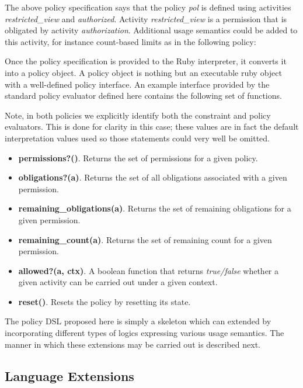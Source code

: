 

The above policy specification says that the policy {\em pol} is defined using activities {\em restricted\_view} and {\em authorized}.  Activity {\em restricted\_view} is a permission that is obligated by activity {\em authorization}.  Additional usage semantics could be added to this activity, for instance count-based limits as in the following policy:



Once the policy specification is provided to the Ruby interpreter, it converts it into a policy object. A policy object is nothing but an executable ruby object with a well-defined policy interface. An example interface provided by the standard policy evaluator defined here contains the following set of functions.

Note, in both policies we explicitly identify both the constraint and policy evaluators.  This is done for clarity in this case; these values are in fact the default interpretation values used so those statements could very well be omitted.

\begin{itemize}
\item {\bf permissions?()}. Returns the set of permissions for a given policy.
\item {\bf obligations?(a)}. Returns the set of all obligations associated with a given permission. 
\item {\bf remaining\_obligations(a)}. Returns the set of remaining obligations for a given permission. 
\item {\bf remaining\_count(a)}. Returns the set of remaining count for a given permission. 
\item {\bf allowed?(a, ctx)}. A boolean function that returns {\em true/false} whether a given activity can be carried out under a given context. 
\item {\bf reset()}. Resets the policy by resetting its state. 
\end{itemize}

The policy DSL proposed here is simply a skeleton which can extended by incorporating different types of logics expressing various usage semantics. The manner in which these extensions may be carried out is described next. 

\subsection{Language Extensions}

